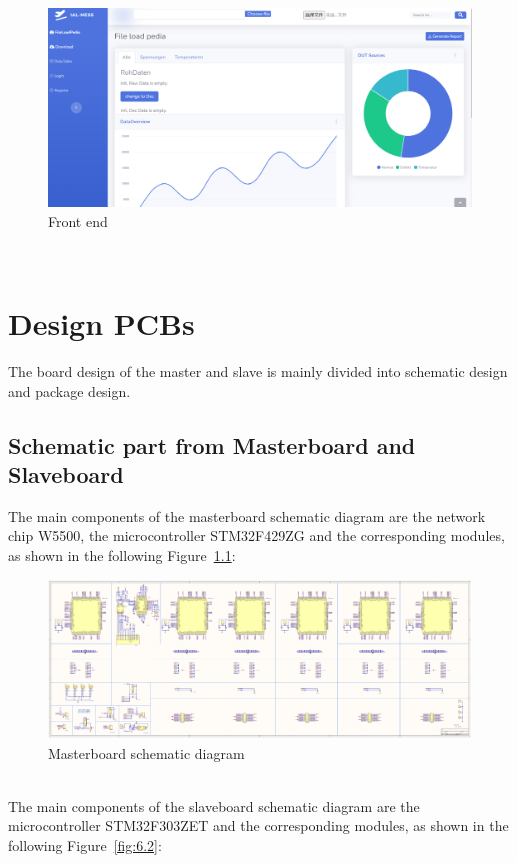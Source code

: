 \begin{figure}[!ht]
	\centering
	\includegraphics[width=16cm]{grafiken/5.9.pdf}
	\caption{Front end} 
	\label{fig:5.9}
\end{figure}
\FloatBarrier
\\
\chapter{Design PCBs}
\label{chap:Design PCBs}
The board design of the master and slave is mainly divided into schematic design and package design.

\section{Schematic part from Masterboard and Slaveboard}
\label{sec:Schematic part from Masterboard and Slaveboard}
The main components of the masterboard schematic diagram are the network chip W5500, the microcontroller STM32F429ZG and the corresponding modules, as shown in the following Figure~\ref{fig:6.1}:

\begin{figure}[!ht]
	\centering
	\includegraphics[width=16cm]{grafiken/6.1.pdf}
	\caption{Masterboard schematic diagram} 
	\label{fig:6.1}
\end{figure}
\FloatBarrier
\\

The main components of the slaveboard schematic diagram are the microcontroller STM32F303ZET and the corresponding modules, as shown in the following Figure~\ref{fig:6.2}:

